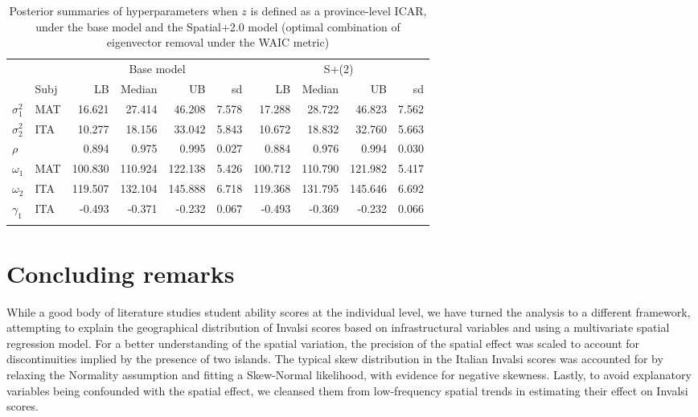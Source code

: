 \documentclass{book}
\begin{document}
\begin{table}[ht]
\centering
\begin{tabular}{ll|rrrr|rrrr}
  \toprule
  && \multicolumn{4}{c|}{Base model} & \multicolumn{4}{c}{S+(2)}\\
 & Subj & LB & Median & UB & sd & LB & Median & UB & sd \\ 
  \midrule
 $\sigma_1^2$ & MAT & 16.621 & 27.414 & 46.208 & 7.578 & 17.288 & 28.722 & 46.823 & 7.562 \\ 
 $\sigma_2^2$ & ITA  & 10.277 & 18.156 & 33.042 & 5.843 & 10.672 & 18.832 & 32.760 & 5.663 \\ 
 $\rho$ &     & 0.894 & 0.975 & 0.995 & 0.027 & 0.884 & 0.976 & 0.994 & 0.030 \\ 
  $\omega_1$ & MAT & 100.830 & 110.924 & 122.138 & 5.426 & 100.712 & 110.790 & 121.982 & 5.417 \\ 
  $\omega_2$ & ITA & 119.507 & 132.104 & 145.888 & 6.718 & 119.368 & 131.795 & 145.646 & 6.692 \\
  $\gamma_1$ & ITA & -0.493 & -0.371 & -0.232 & 0.067 & -0.493 & -0.369 & -0.232 & 0.066 \\ 
   \botrule
\end{tabular}
\caption{Posterior summaries of hyperparameters when $z$ is defined as a province-level ICAR, under the base model and the Spatial+2.0 model (optimal combination of eigenvector removal under the WAIC metric)}
\label{tab:hyperpar}
\end{table}

\section{Concluding remarks}

While a good body of literature studies student ability scores at the individual level, we have turned the analysis to a different framework, attempting to explain the geographical distribution of Invalsi scores based on infrastructural variables and using a multivariate spatial regression model. For a better understanding of the spatial variation, the precision of the spatial effect was scaled to account for discontinuities implied by the presence of two islands. The typical skew distribution in the Italian Invalsi scores was accounted for by relaxing the Normality assumption and fitting a Skew-Normal likelihood, with evidence for negative skewness. Lastly, to avoid explanatory variables being confounded with the spatial effect, we cleansed them from low-frequency spatial trends in estimating their effect on Invalsi scores.
\end{document}
